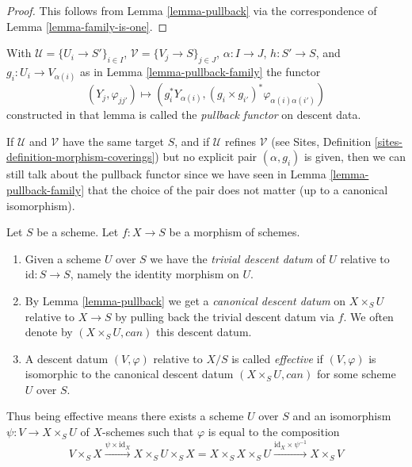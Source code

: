 \begin{proof}
This follows from Lemma \ref{lemma-pullback} via the
correspondence of Lemma \ref{lemma-family-is-one}.
\end{proof}

\begin{definition}
\label{definition-pullback-functor-family}
With $\mathcal{U} = \{U_i \to S'\}_{i \in I}$,
$\mathcal{V} = \{V_j \to S\}_{j \in J}$, $\alpha : I \to J$, $h : S' \to S$,
and $g_i : U_i \to V_{\alpha(i)}$ as in Lemma \ref{lemma-pullback-family}
the functor
$$
(Y_j, \varphi_{jj'}) \longmapsto
(g_i^*Y_{\alpha(i)}, (g_i \times g_{i'})^*\varphi_{\alpha(i)\alpha(i')})
$$
constructed in that lemma
is called the {\it pullback functor} on descent data.
\end{definition}

\noindent
If $\mathcal{U}$ and $\mathcal{V}$ have the same target $S$,
and if $\mathcal{U}$ refines $\mathcal{V}$ (see
Sites, Definition \ref{sites-definition-morphism-coverings})
but no explicit pair $(\alpha, g_i)$ is given, then we can still
talk about the pullback functor since we have seen in
Lemma \ref{lemma-pullback-family} that the choice of the pair does not matter
(up to a canonical isomorphism).


\begin{definition}
\label{definition-effective}
Let $S$ be a scheme.
Let $f : X \to S$ be a morphism of schemes.
\begin{enumerate}
\item  Given a scheme $U$ over $S$ we have the
{\it trivial descent datum} of $U$ relative to
$\text{id} : S \to S$, namely the identity morphism on $U$.
\item By Lemma \ref{lemma-pullback} we get a
{\it canonical descent datum} on $X \times_S U$
relative to $X \to S$ by pulling back the trivial
descent datum via $f$. We often
denote by $(X \times_S U, can)$ this descent datum.
\item A descent datum $(V, \varphi)$ relative to $X/S$ is
called {\it effective} if $(V, \varphi)$
is isomorphic to the canonical descent datum
$(X \times_S U, can)$ for some scheme $U$ over $S$.
\end{enumerate}
\end{definition}

\noindent
Thus being effective means there exists a scheme $U$
over $S$ and an isomorphism $\psi : V \to X \times_S U$
of $X$-schemes such that $\varphi$ is equal to the composition
$$
V \times_S X \xrightarrow{\psi \times \text{id}_X}
X \times_S U \times_S X =
X \times_S X \times_S U
\xrightarrow{\text{id}_X \times \psi^{-1}}
X \times_S V
$$

